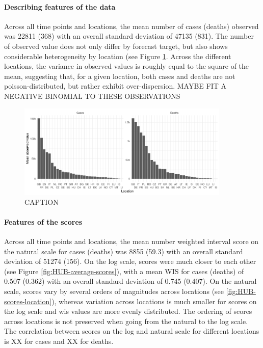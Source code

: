 \documentclass{article}
\begin{document}
\paragraph{Describing features of the data}
Across all time points and locations, the mean number of cases (deaths) observed was 22811 (368) with an overall standard deviation of 47135 (831). The number of observed value does not only differ by forecast target, but also shows considerable heterogeneity by location (see Figure \ref{fig:HUB-mean-locations}. Across the different locations, the variance in observed values is roughly equal to the square of the mean, suggesting that, for a given location, both cases and deaths are not poisson-distributed, but rather exhibit over-dispersion. 
MAYBE FIT A NEGATIVE BINOMIAL TO THESE OBSERVATIONS

\begin{figure}[h!]
    \centering
    \includegraphics[width=0.9\textwidth]{output/figures/HUB-mean-obs-location.png}
    \caption{CAPTION}
    \label{fig:HUB-mean-locations}
\end{figure}

\paragraph{Features of the scores}
Across all time points and locations, the mean number weighted interval score on the natural scale for cases (deaths) was 8855 (59.3) with an overall standard deviation of 51274 (156). On the log scale, scores were much closer to each other (see Figure \ref{fig:HUB-average-scores}), with a mean WIS for cases (deaths) of 0.507 (0.362) with an overall standard deviation of 0.745 (0.407). 
On the natural scale, scores vary by several orders of magnitudes across locations (see \ref{fig:HUB-scores-location}), whereas variation across locations is much smaller for scores on the log scale and wis values are more evenly distributed. The ordering of scores across locations is not preserved when going from the natural to the log scale. 
The correlation between scores on the log and natural scale for different locations is XX for cases and XX for deaths. 
\end{document}
